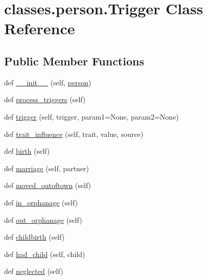 \hypertarget{classclasses_1_1person_1_1Trigger}{}\section{classes.\+person.\+Trigger Class Reference}
\label{classclasses_1_1person_1_1Trigger}
\subsection*{Public Member Functions}
\begin{DoxyCompactItemize}
\item 
def \hyperlink{classclasses_1_1person_1_1Trigger_a067117fe7f2992182b33643c61924d34}{\+\_\+\+\_\+init\+\_\+\+\_\+} (self, \hyperlink{classclasses_1_1person_1_1Trigger_af921a5abd6e99f94e2701c14caeaab2e}{person})
\item 
def \hyperlink{classclasses_1_1person_1_1Trigger_a2fbab99955d8b9795f3a30e36aec67f0}{process\+\_\+triggers} (self)
\item 
def \hyperlink{classclasses_1_1person_1_1Trigger_af785ebfde1ef62979d4699ac0b1a4fad}{trigger} (self, trigger, param1=None, param2=None)
\item 
def \hyperlink{classclasses_1_1person_1_1Trigger_ab9531f98ff5dd727b4117181544693bf}{trait\+\_\+influence} (self, trait, value, source)
\item 
def \hyperlink{classclasses_1_1person_1_1Trigger_a0bd97da99249a6fffd4615db06f77cc1}{birth} (self)
\item 
def \hyperlink{classclasses_1_1person_1_1Trigger_aff377845557dcbc8864f07802be24d2a}{marriage} (self, partner)
\item 
def \hyperlink{classclasses_1_1person_1_1Trigger_a02d4473b2573cbec266850e8fe40175d}{moved\+\_\+outoftown} (self)
\item 
def \hyperlink{classclasses_1_1person_1_1Trigger_a79dad81e58056dd8924414eda76e36f4}{in\+\_\+orphanage} (self)
\item 
def \hyperlink{classclasses_1_1person_1_1Trigger_a3cd61fa1e6cd48727a95c6d85469530c}{out\+\_\+orphanage} (self)
\item 
def \hyperlink{classclasses_1_1person_1_1Trigger_a496cc1ffb2bb8cd111e31793fe3f7cf1}{childbirth} (self)
\item 
def \hyperlink{classclasses_1_1person_1_1Trigger_ac09a6065cff0b842c828319d772c7367}{had\+\_\+child} (self, child)
\item 
def \hyperlink{classclasses_1_1person_1_1Trigger_a3fc49138147bc768c9c9a9d409c9b025}{neglected} (self)

\end{DoxyCompactItemize}
